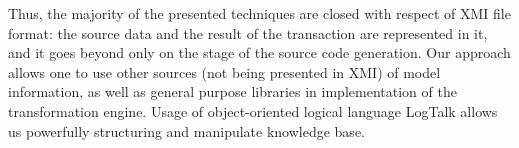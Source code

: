 \documentclass[conference]{IEEEtran} \IEEEoverridecommandlockouts
\begin{document}
Thus, the majority of the presented techniques are closed with respect of XMI file format: the source data and the result of the transaction are represented in it, and it goes beyond only on the stage of the source code generation. Our approach allows one to use other sources (not being presented in XMI) of model information, as well as general purpose libraries in implementation of the transformation engine. Usage of object-oriented logical language LogTalk allows us powerfully structuring and manipulate knowledge base. 
\end{document}
